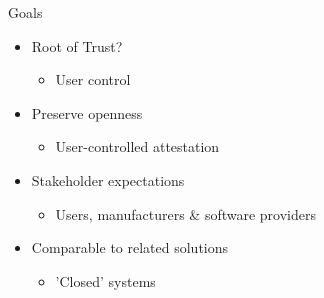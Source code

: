 \documentclass[]{beamer}
\begin{document}
\begin{frame}{Goals}
\begin{itemize}
\item Root of Trust? \begin{itemize}
\item User control
\end{itemize}
\item Preserve openness \begin{itemize}
\item User-controlled attestation
\end{itemize}
\item Stakeholder expectations \begin{itemize}
\item Users, manufacturers \& software providers
\end{itemize}
\item Comparable to related solutions \begin{itemize}
\item 'Closed' systems
\end{itemize}
\end{itemize}
\end{frame}
\end{document}
